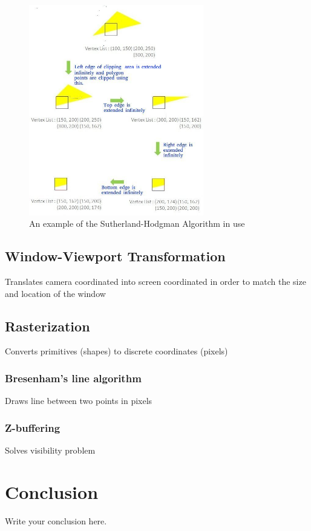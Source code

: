 \documentclass{article}
\begin{document}
\begin{figure}[H]
    \centering
    \includegraphics[width=3.0in]{Sutherland-Hodgman-Example.jpg}
    \caption{An example of the Sutherland-Hodgman Algorithm in use}
    \label{Sutherland-Hodgman}
\end{figure}

\subsection{Window-Viewport Transformation}
Translates camera coordinated into screen coordinated in order to match the size and location of the window

\subsection{Rasterization}
Converts primitives (shapes) to discrete coordinates (pixels)

\subsubsection{Bresenham's line algorithm}
Draws line between two points in pixels

\subsubsection{Z-buffering}
Solves visibility problem
\section{Conclusion}
Write your conclusion here.
\end{document}
